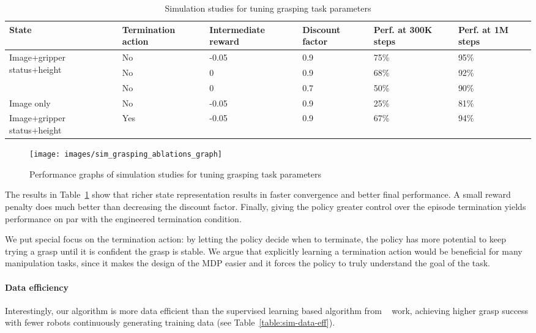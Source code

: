 \documentclass{article}
\begin{document}
\begin{table}[h]
\begin{center}
\begin{tabular}{ |p{7em}|p{5em}|p{5em}|p{5em}|p{5em}|p{5em}| } 
\hline
State & Termination action & Intermediate reward & Discount factor & Perf. at 300K steps & Perf. at 1M steps\\
\hline
\multirow{3}{7em}{Image+gripper status+height}
& No & -0.05 & 0.9 & 75\%& 95\% \\ %
& No & 0 & 0.9 & 68\%& 92\% \\ %
& No & 0 & 0.7 & 50\%& 90\% \\ %
\hline
Image only & No & -0.05 & 0.9 & 25\%& 81\% \\ %
\hline
Image+gripper status+height & Yes & -0.05 & 0.9 & 67\%& 94\% \\
\hline
\end{tabular}
\end{center}
\caption{Simulation studies for tuning grasping task parameters}
\label{table:sim-grasping-ablation}
\end{table}\begin{figure}[h]
\centering
 \texttt{[image: images/sim\_grasping\_ablations\_graph]}
   \caption{Performance graphs of simulation studies for tuning grasping task parameters}
\label{fig:sim-graphs}
\vspace{-0.05in}
\end{figure}
The results in Table~\ref{table:sim-grasping-ablation} show that richer state representation results in faster convergence and better final performance. A small reward penalty does much better than decreasing the discount factor. Finally, giving the policy greater control over the episode termination yields performance on par with the engineered termination condition.

We put special focus on the termination action: by letting the policy decide when to terminate, the policy has more potential to keep trying a grasp until it is confident the grasp is stable. We argue that explicitly learning a termination action would be beneficial for many manipulation tasks, since it makes the design of the MDP easier and it forces the policy to truly understand the goal of the task.

\paragraph{Data efficiency} 
Interestingly, our algorithm is more data efficient than the supervised learning based algorithm from ~\citet{levine16} work, achieving higher grasp success with fewer robots continuously generating training data (see Table~\ref{table:sim-data-eff}).
\end{document}

